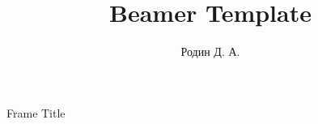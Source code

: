 \documentclass{beamer}
\title{Beamer Template}
\author{Родин Д. А.}
\begin{document}
\begin{frame}[plain]
    \maketitle
\end{frame}
\begin{frame}{Frame Title}
\end{frame}
\end{document}
